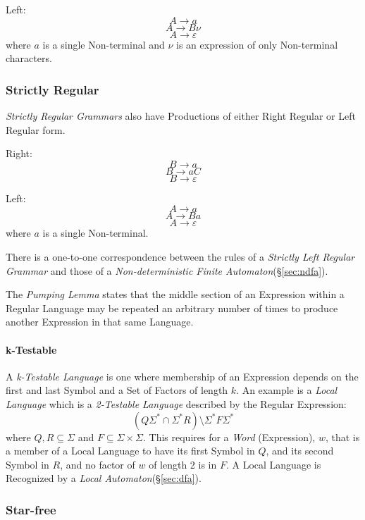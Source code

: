 Left:
\[
    A \rightarrow a
\]\[
    A \rightarrow B \nu
\]\[
    A \rightarrow \varepsilon
\]
where $a$ is a single Non-terminal and $\nu$ is an expression of only
Non-terminal characters.



\subsubsection{Strictly Regular}\label{sec:strictly_regular}
\emph{Strictly Regular Grammars} also have Productions of either Right
Regular or Left Regular form.

Right:
\[
    B \rightarrow a
\]\[
    B \rightarrow aC
\]\[
    B \rightarrow \varepsilon
\]

Left:
\[
    A \rightarrow a
\]\[
    A \rightarrow Ba
\]\[
    A \rightarrow \varepsilon
\]
where $a$ is a single Non-terminal.

There is a one-to-one correspondence between the rules of a
\emph{Strictly Left Regular Grammar} and those of a
\emph{Non-deterministic Finite Automaton}(\S\ref{sec:ndfa}).

The \emph{Pumping Lemma} states that the middle section of an
Expression within a Regular Language may be repeated an arbitrary
number of times to produce another Expression in that same Language.

\paragraph{k-Testable}\label{sec:k_testable}
A \emph{k-Testable Language} is one where membership of an Expression
depends on the first and last Symbol and a Set of Factors of length
$k$. An example is a \emph{Local Language} which is a \emph{2-Testable
  Language} described by the Regular Expression:
\[
    (Q\Sigma^* \cap \Sigma^*R)\setminus\Sigma^*F\Sigma^*
\]
where $Q,R \subseteq \Sigma$ and $F \subseteq \Sigma \times
\Sigma$. This requires for a \emph{Word} (Expression), $w$, that is a
member of a Local Language to have its first Symbol in $Q$, and its
second Symbol in $R$, and no factor of $w$ of length 2 is in $F$. A
Local Language is Recognized by a \emph{Local
  Automaton}(\S\ref{sec:dfa}).



\subsubsection{Star-free}\label{sec:starfree_grammar}


